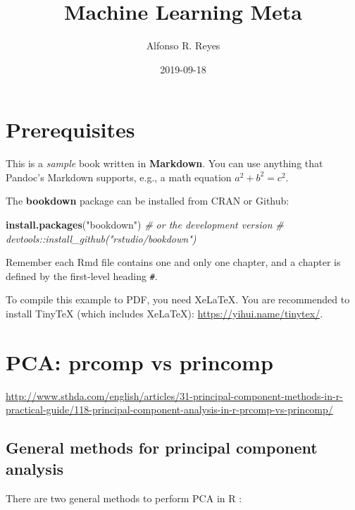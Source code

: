 \documentclass[]{book}
\title{Machine Learning Meta}
\author{Alfonso R. Reyes}
\date{2019-09-18}
\newenvironment{Shaded}{\begin{snugshade}}{\end{snugshade}}
\newcommand{\CommentTok}[1]{\textcolor[rgb]{0.56,0.35,0.01}{\textit{#1}}}
\newcommand{\KeywordTok}[1]{\textcolor[rgb]{0.13,0.29,0.53}{\textbf{#1}}}
\newcommand{\NormalTok}[1]{#1}
\newcommand{\StringTok}[1]{\textcolor[rgb]{0.31,0.60,0.02}{#1}}
\begin{document}
\maketitle

{
\setcounter{tocdepth}{1}
\tableofcontents
}
\hypertarget{prerequisites}{%
\chapter*{Prerequisites}\label{prerequisites}}

This is a \emph{sample} book written in \textbf{Markdown}. You can use anything that Pandoc's Markdown supports, e.g., a math equation \(a^2 + b^2 = c^2\).

The \textbf{bookdown} package can be installed from CRAN or Github:

\begin{Shaded}
\begin{Highlighting}[]
\KeywordTok{install.packages}\NormalTok{(}\StringTok{"bookdown"}\NormalTok{)}
\CommentTok{# or the development version}
\CommentTok{# devtools::install_github("rstudio/bookdown")}
\end{Highlighting}
\end{Shaded}

Remember each Rmd file contains one and only one chapter, and a chapter is defined by the first-level heading \texttt{\#}.

To compile this example to PDF, you need XeLaTeX. You are recommended to install TinyTeX (which includes XeLaTeX): \url{https://yihui.name/tinytex/}.

\hypertarget{pca-prcomp-vs-princomp}{%
\chapter{PCA: prcomp vs princomp}\label{pca-prcomp-vs-princomp}}

\url{http://www.sthda.com/english/articles/31-principal-component-methods-in-r-practical-guide/118-principal-component-analysis-in-r-prcomp-vs-princomp/}

\hypertarget{general-methods-for-principal-component-analysis}{%
\section{General methods for principal component analysis}\label{general-methods-for-principal-component-analysis}}

There are two general methods to perform PCA in R :
\end{document}
